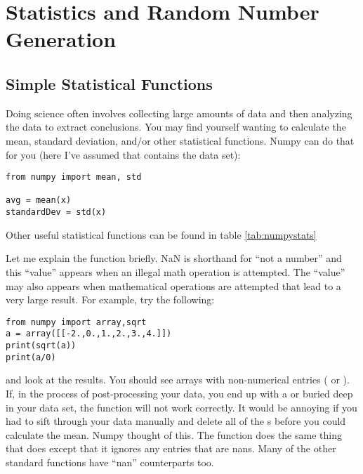 \chapter{Statistics and Random Number Generation}

\label{chap:Statistics}
\section{Simple Statistical Functions}
Doing science often involves collecting large amounts of data and then
analyzing the data to extract conclusions.  You may find yourself
wanting to calculate the mean, standard deviation, and/or other
statistical functions.  Numpy can do that for you (here I've assumed
that  contains the data set):
\begin{Verbatim}
from numpy import mean, std

avg = mean(x)
standardDev = std(x)
\end{Verbatim}
Other useful statistical functions can be found in table \ref{tab:numpystats}


Let me explain the function  briefly.  NaN is shorthand
for ``not a number'' and this ``value'' appears when an illegal math
operation is attempted. The ``value''  may also appears when
  mathematical operations are attempted that lead to a very large
  result.  For example, try the following:
\begin{Verbatim}
from numpy import array,sqrt
a = array([[-2.,0.,1.,2.,3.,4.]])
print(sqrt(a))
print(a/0)
\end{Verbatim}
and look at the results.  You should see arrays with non-numerical
entries ( or ).  If, in the process of
post-processing your data, you end up with a  or 
buried deep in your data set, the function  will not work correctly.
It would be annoying if you had to sift through your
data manually and delete all of the s before you could
calculate the mean.  Numpy thought of this.  The function
 does the same thing that  does except that it
ignores any entries that are nans.  Many of the other
standard functions have ``nan'' counterparts too.


